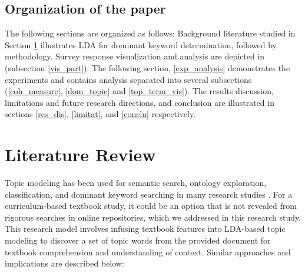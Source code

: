 \documentclass[sn-mathphys,Numbered]{sn-jnl}%
\theoremstyle{thmstyleone}%
\theoremstyle{thmstyletwo}%
\theoremstyle{thmstylethree}%
\begin{document}
 

\subsection{Organization of the paper}
The following sections are organized as follows: Background literature studied in Section \ref{lit_review} illustrates LDA for dominant keyword determination, followed by methodology. Survey response visualization and analysis are depicted in (subsection \ref{vis_part}). The following section, \ref{exp_analysis} demonstrates the experiments and contains analysis separated into several subsections (\ref{coh_measure}, \ref{dom_topic} and \ref{top_term_vis}). The results discussion, limitations and future research directions, and conclusion are illustrated in sections \ref{res_dis}, \ref{limitat}, and \ref{conclu} respectively.\\


\section{Literature Review}\label{lit_review} 
Topic modeling has been used for semantic search, ontology exploration, classification, and dominant keyword searching in many research studies \cite{sakhovskiy2020topic, molavi2020extracting, hamzah2020discovering}. For a curriculum-based textbook study, it could be an option that is not revealed from rigorous searches in online repositories, which we addressed in this research study. This research model involves infusing textbook features into LDA-based topic modeling to discover a set of topic words from the provided document for textbook comprehension and understanding of context. Similar approaches and implications are described below: 
\end{document}
